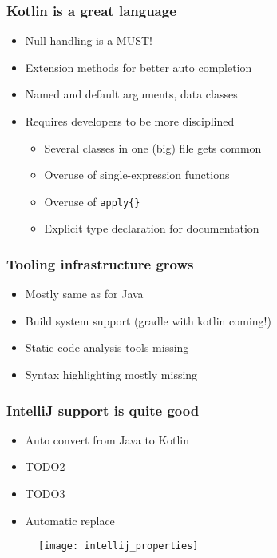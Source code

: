 


\begin{frame}
\frametitle{Kotlin is a great language}
\begin{itemize}
	\item Null handling is a MUST!
	\item Extension methods for better auto completion
	\item Named and default arguments, data classes
	\item Requires developers to be more disciplined
	\begin{itemize}
		\item Several classes in one (big) file gets common
		\item Overuse of single-expression functions
		\item Overuse of \texttt{apply\{\}}
		\item Explicit type declaration for documentation
	\end{itemize}
\end{itemize}
\end{frame}


\begin{frame}
\frametitle{Tooling infrastructure grows}
\begin{itemize}
	\item Mostly same as for Java
	\item Build system support (gradle with kotlin coming!)
	\item Static code analysis tools missing
	\item Syntax highlighting mostly missing
\end{itemize}
\end{frame}

\begin{frame}
\frametitle{IntelliJ support is quite good}
\begin{itemize}
	\item Auto convert from Java to Kotlin
	\item TODO2
	\item TODO3
	\item Automatic replace
\end{itemize}
\begin{figure}[h]
\centering
  \texttt{[image: intellij\_properties]}
\end{figure}

\end{frame}


